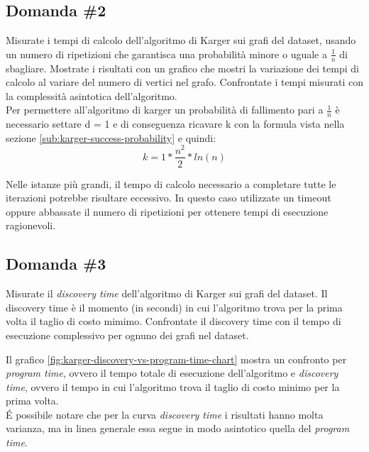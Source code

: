 \subsection{Domanda \#2}
\label{sec:question-2}

\begin{displayquote}
Misurate i tempi di calcolo dell'algoritmo di Karger sui grafi del dataset, usando un numero di ripetizioni che garantisca una probabilità minore o uguale a $\frac{1}{n}$ di sbagliare. Mostrate i risultati con un grafico che mostri la variazione dei tempi di calcolo al variare del numero di vertici nel grafo. Confrontate i tempi misurati con la complessità asintotica dell'algoritmo. \\


Per permettere all'algoritmo di karger un probabilità di fallimento pari a $\frac{1}{n}$ è necessario settare d = 1 e di conseguenza ricavare k con la formula vista nella sezione \ref{sub:karger-success-probability} e quindi:
$$ k = 1 * \frac{n^2}{2} * ln(n)$$

Nelle istanze più grandi, il tempo di calcolo necessario a completare tutte le iterazioni potrebbe risultare eccessivo. In questo caso utilizzate un timeout oppure abbassate il numero di ripetizioni per ottenere tempi di esecuzione ragionevoli.
\end{displayquote}

\subsection{Domanda \#3}
\label{sec:question-3}

\begin{displayquote}
Misurate il \textit{discovery time} dell'algoritmo di Karger sui grafi
del dataset. Il discovery time è il momento (in secondi) in cui
l'algoritmo trova per la prima volta il taglio di costo mimimo.
Confrontate il discovery time con il tempo di esecuzione complessivo
per ognuno dei grafi nel dataset.
\end{displayquote}

\noindent Il grafico \ref{fig:karger-discovery-vs-program-time-chart}
mostra un confronto per \emph{program time}, ovvero il tempo totale di
esecuzione dell'algoritmo e \emph{discovery time}, ovvero il tempo in
cui l'algoritmo trova il taglio di costo minimo per la prima volta.\\

\noindent \'E possibile notare che per la curva \emph{discovery time}
i risultati hanno molta varianza, ma in linea generale essa segue in modo
asintotico quella del \emph{program time}.\\

